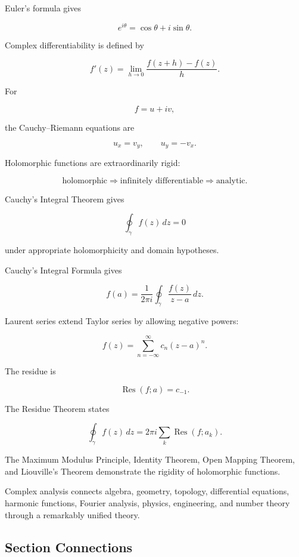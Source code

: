 Euler's formula gives

\[
\boxed{
e^{i\theta}
=
\cos\theta+i\sin\theta.
}
\]

Complex differentiability is defined by

\[
\boxed{
f'(z)
=
\lim_{h\to0}
\frac{f(z+h)-f(z)}{h}.
}
\]

For

\[
f=u+iv,
\]

the Cauchy--Riemann equations are

\[
\boxed{
u_x=v_y,
\qquad
u_y=-v_x.
}
\]

Holomorphic functions are extraordinarily rigid:

\[
\boxed{
\text{holomorphic}
\Longrightarrow
\text{infinitely differentiable}
\Longrightarrow
\text{analytic}.
}
\]

Cauchy's Integral Theorem gives

\[
\boxed{
\oint_\gamma f(z)\,dz=0
}
\]

under appropriate holomorphicity and domain hypotheses.

Cauchy's Integral Formula gives

\[
\boxed{
f(a)
=
\frac{1}{2\pi i}
\oint_\gamma
\frac{f(z)}{z-a}\,dz.
}
\]

Laurent series extend Taylor series by allowing negative powers:

\[
\boxed{
f(z)
=
\sum_{n=-\infty}^{\infty}
c_n(z-a)^n.
}
\]

The residue is

\[
\boxed{
\operatorname{Res}(f;a)=c_{-1}.
}
\]

The Residue Theorem states

\[
\boxed{
\oint_\gamma f(z)\,dz
=
2\pi i
\sum_k
\operatorname{Res}(f;a_k).
}
\]

The Maximum Modulus Principle, Identity Theorem, Open Mapping Theorem, and
Liouville's Theorem demonstrate the rigidity of holomorphic functions.

Complex analysis connects algebra, geometry, topology, differential
equations, harmonic functions, Fourier analysis, physics, engineering,
and number theory through a remarkably unified theory.

\subsection{Section Connections}
\label{subsec:complex-analysis-connections}

